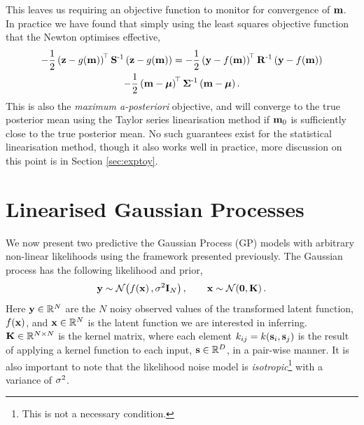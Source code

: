 \documentclass{article} %
\begin{document}
This leaves us requiring an objective function to monitor for convergence of 
$\mathbf{m}$. In practice we have found that simply using the least squares 
objective function that the Newton optimises effective,
\begin{multline}
    -\frac{1}{2}
        \left({\mathbf{z} - g\!\left({{\mathbf{m}}}\right)}\right)^{\!\top}
        \mathbf{S}^{\text{-}1}
        \left({\mathbf{z} - g\!\left({{\mathbf{m}}}\right)}\right) 
    = -\frac{1}{2} \left({\mathbf{y} - f\!\left({{\mathbf{m}}}\right)}\right)^{\!\top}
            \mathbf{R}^{\text{-}1}
            \left({\mathbf{y} - f\!\left({{\mathbf{m}}}\right)}\right) \\
    -\frac{1}{2}
        \left({\mathbf{m} - \boldsymbol{\mu}}\right)^{\!\top}
        \boldsymbol{\Sigma}^{\text{-}1}
        \left({\mathbf{m} - \boldsymbol{\mu}}\right). 
\end{multline}
This is also the \emph{maximum a-posteriori} objective, and will converge to
the true posterior mean using the Taylor series linearisation method if 
$\mathbf{m}_0$ is sufficiently close to the true posterior mean. No such
guarantees exist for the statistical linearisation method, though it also works
well in practice, more discussion on this point is in Section \ref{sec:exptoy}. 


\section{Linearised Gaussian Processes}

We now present two predictive the Gaussian Process (GP) models
\cite{Rasmussen2006} with arbitrary non-linear likelihoods using the framework
presented previously. The Gaussian process has the following likelihood and
prior,
\begin{equation}
    \mathbf{y} \sim \mathcal{N}\!\left({f\!\left({{\mathbf{x}}}\right), \sigma^2\mathbf{I}_{N}}\right), \qquad
    \mathbf{x} \sim \mathcal{N}\!\left({\mathbf{0}, \mathbf{K}}\right).
    \label{eq:gplikeprior}
\end{equation}
Here $\mathbf{y} \in \mathbb{R}^{N}$ are the $N$ noisy observed values of the transformed
latent function, $f\!\left({{\mathbf{x}}}\right)$, and $\mathbf{x} \in \mathbb{R}^{N}$ is the latent
function we are interested in inferring. $\mathbf{K} \in \mathbb{R}^{N\times N}$ is the
kernel matrix, where each element $k_{ij} = k\!\left({\mathbf{s}_i,
    \mathbf{s}_j}\right)$ is the result of applying a kernel function to each input,
$\mathbf{s} \in \mathbb{R}^{D}$, in a pair-wise manner. It is also important to note that
the likelihood noise model is \emph{isotropic}\footnote{This is not a necessary
    condition.} with a variance of $\sigma^2$. 
\end{document}
